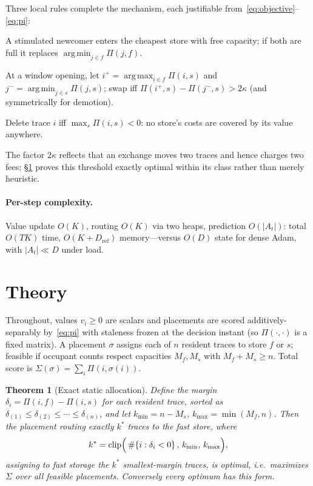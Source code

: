 \documentclass[10pt,twocolumn]{article}
\newtheorem{theorem}{Theorem}
\theoremstyle{definition}
\DeclareMathOperator{\argmax}{arg\,max}
\DeclareMathOperator{\argmin}{arg\,min}
\begin{document}
Three local rules complete the mechanism, each justifiable from~\eqref{eq:objective}--\eqref{eq:pi}:
\begin{description}\setlength{\itemsep}{0pt}
\item[\textbf{W-rule} (write).] A stimulated newcomer enters the cheapest store with free capacity; if both
are full it replaces $\argmin_{j\in f}\Pi(j,f)$.
\item[\textbf{R-rule} (promote/demote).] At a window opening, let $i^+=\argmax_{i\in f}\Pi(i,s)$ and
$j^-=\argmin_{j\in s}\Pi(j,s)$; swap iff
$\Pi(i^+,s)-\Pi(j^-,s)>2\kappa$ (and symmetrically for demotion).
\item[\textbf{F-rule} (forget).] Delete trace $i$ iff $\max_s\Pi(i,s)<0$: no store's costs are covered by its
value anywhere.
\end{description}
The factor $2\kappa$ reflects that an exchange moves two traces and hence charges two fees;
\S\ref{sec:theory} proves this threshold exactly optimal within its class rather than merely heuristic.

\paragraph{Per-step complexity.} Value update $O(K)$, routing $O(K)$ via two heaps, prediction
$O(|A_t|)$: total $O(TK)$ time, $O(K+D_{\mathrm{ref}})$ memory---versus $O(D)$ state for dense Adam, with
$|A_t|\ll D$ under load.

\section{Theory}\label{sec:theory}

Throughout, values $v_i\ge 0$ are scalars and placements are scored additively-separably by~\eqref{eq:pi}
with staleness frozen at the decision instant (so $\Pi(\cdot,\cdot)$ is a fixed matrix). A placement
$\sigma$ assigns each of $n$ resident traces to store $f$ or $s$; feasible if occupant counts respect
capacities $M_f,M_s$ with $M_f+M_s\ge n$. Total score is $\Sigma(\sigma)=\sum_i \Pi(i,\sigma(i))$.

\begin{theorem}[Exact static allocation]\label{thm:static}
Define the margin $\delta_i=\Pi(i,f)-\Pi(i,s)$ for each resident trace, sorted as
$\delta_{(1)}\le\delta_{(2)}\le\cdots\le\delta_{(n)}$, and let
$k_{\min}=n-M_s$, $k_{\max}=\min(M_f,n)$. Then the placement routing exactly $k^{\ast}$ traces to the fast
store, where
\[
k^{\ast}=\operatorname{clip}\Bigl(\,\#\{i:\delta_i<0\}\,,\,k_{\min},\,k_{\max}\Bigr),
\]
assigning to fast storage the $k^{\ast}$ smallest-margin traces, is optimal, i.e.\ maximizes $\Sigma$ over all
feasible placements. Conversely every optimum has this form.
\end{theorem}
\end{document}
